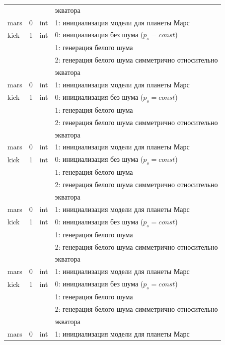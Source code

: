 \begin{longtable*}[c]{|l|c|l|l|}
    & & & экватора    \\
    mars & 0 & int & 1: инициализация модели для планеты Марс     \\
    kick & 1 & int & 0: инициализация без шума (\(p_s = const\)) \\
    &   &     & 1: генерация белого шума                  \\
    &   &     & 2: генерация белого шума симметрично относительно \\
    & & & экватора    \\
    mars & 0 & int & 1: инициализация модели для планеты Марс     \\
    kick & 1 & int & 0: инициализация без шума (\(p_s = const\)) \\
    &   &     & 1: генерация белого шума                  \\
    &   &     & 2: генерация белого шума симметрично относительно \\
    & & & экватора    \\
    mars & 0 & int & 1: инициализация модели для планеты Марс     \\
    kick & 1 & int & 0: инициализация без шума (\(p_s = const\)) \\
    &   &     & 1: генерация белого шума                  \\
    &   &     & 2: генерация белого шума симметрично относительно \\
    & & & экватора    \\
    mars & 0 & int & 1: инициализация модели для планеты Марс     \\
    kick & 1 & int & 0: инициализация без шума (\(p_s = const\)) \\
    &   &     & 1: генерация белого шума                  \\
    &   &     & 2: генерация белого шума симметрично относительно \\
    & & & экватора    \\
    mars & 0 & int & 1: инициализация модели для планеты Марс     \\
    kick & 1 & int & 0: инициализация без шума (\(p_s = const\)) \\
    &   &     & 1: генерация белого шума                  \\
    &   &     & 2: генерация белого шума симметрично относительно \\
    & & & экватора    \\
    mars & 0 & int & 1: инициализация модели для планеты Марс     \\

\end{longtable*}
